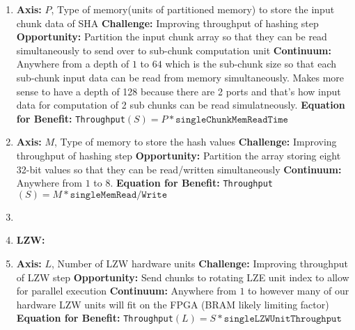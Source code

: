 \documentclass{article}
\begin{document}
\begin{enumerate}
\item%

\textbf{Axis:} $P$, Type of memory(units of partitioned memory) to store the input chunk data of SHA
\newline
\textbf{Challenge:} Improving throughput of hashing step
\newline
\textbf{Opportunity:} Partition the input chunk array so that they can be read simultaneously to send over to sub-chunk computation unit
\newline
\textbf{Continuum:} Anywhere from a depth of $1$ to $64$ which is the sub-chunk size so that each sub-chunk input data can be read from memory simultaneously. Makes more sense to have a depth of 128 because there are 2 ports and that's how input data for computation of 2 sub chunks can be read simulatneously.    
\newline
\textbf{Equation for Benefit:} \texttt{Throughput}$\left(S\right)=P*\texttt{singleChunkMemReadTime}$

\item%

\textbf{Axis:} $M$, Type of memory to store the hash values  
\newline
\textbf{Challenge:} Improving throughput of hashing step
\newline
\textbf{Opportunity:} Partition the array storing eight 32-bit values so that they can be read/written simultaneously
\newline
\textbf{Continuum:} Anywhere from $1$ to $8$.  
\newline
\textbf{Equation for Benefit:} \texttt{Throughput}$\left(S\right)=M*\texttt{singleMemRead/Write}$

\item%


\item%


\textbf{LZW:}
\item%

\textbf{Axis:} $L$, Number of LZW hardware units
\newline
\textbf{Challenge:} Improving throughput of LZW step
\newline
\textbf{Opportunity:} Send chunks to rotating LZE unit index to allow for parallel execution
\newline
\textbf{Continuum:} Anywhere from $1$ to however many of our hardware LZW units will fit on the FPGA (BRAM likely limiting factor)
\newline
\textbf{Equation for Benefit:} \texttt{Throughput}$\left(L\right)=S*\texttt{singleLZWUnitThroughput}$


\end{enumerate}
\end{document}
